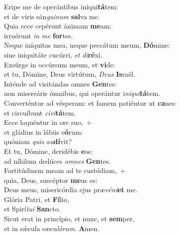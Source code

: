 \evenverse Eripe me de operántibus iniqui\textbf{tá}tem:~\*\\
\evenverse et de viris sán\textit{gui}\textit{num} \textbf{sal}va me.\\
\oddverse Quia ecce cepérunt ánimam \textbf{me}am:~\*\\
\oddverse irruérunt \textit{in} \textit{me} \textbf{for}tes.\\
\evenverse Neque iníquitas mea, neque peccátum meum, \textbf{Dó}mine:~\*\\
\evenverse sine iniquitáte cucúrri, \textit{et} \textit{di}\textbf{ré}xi.\\
\oddverse Exsúrge in occúrsum meum, et \textbf{vi}de:~\*\\
\oddverse et tu, Dómine, Deus virtútum, \textit{De}\textit{us} \textbf{Is}raël.\\
\evenverse Inténde ad visitándas omnes \textbf{Gen}tes:~\*\\
\evenverse non misereáris ómnibus, qui operántur i\textit{ni}\textit{qui}\textbf{tá}tem.\\
\oddverse Converténtur ad vésperam: et famem patiéntur ut \textbf{ca}nes:~\*\\
\oddverse et circuíbunt \textit{ci}\textit{vi}\textbf{tá}tem.\\
\evenverse Ecce loquéntur in ore suo,~+\\
\evenverse  et gládius in lábiis e\textbf{ó}rum:~\*\\
\evenverse quóniam \textit{quis} \textit{au}\textbf{dí}vit?\\
\oddverse Et tu, Dómine, deridébis \textbf{e}os:~\*\\
\oddverse ad níhilum dedúces \textit{om}\textit{nes} \textbf{Gen}tes.\\
\evenverse Fortitúdinem meam ad te custódiam,~+\\
\evenverse  quia, Deus, suscéptor \textbf{me}us es:~\*\\
\evenverse Deus meus, misericórdia ejus præ\textit{vé}\textit{ni}\textbf{et} me.\\
\oddverse Glória Patri, et \textbf{Fí}lio,~\*\\
\oddverse et Spirí\textit{tu}\textit{i} \textbf{San}cto.\\
\evenverse Sicut erat in princípio, et nunc, et \textbf{sem}per,~\*\\
\evenverse et in sǽcula sæcu\textit{ló}\textit{rum}. \textbf{A}men.\\
